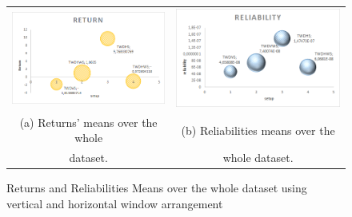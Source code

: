 \documentclass{beamer}
\begin{document}
\begin{frame}
\begin{figure}
    \centering
		\begin{tabular}{c c}
        \includegraphics[scale=0.5]{TWDReturns.png} &
        \includegraphics[scale=0.5]{TWDReliabilities.png} \\
      \scriptsize (a) Returns' means over the whole  & \scriptsize (b) Reliabilities means over the \\ 
			\scriptsize dataset. & \scriptsize whole dataset.\\
		\end{tabular}	
\caption{Returns and Reliabilities Means over the whole dataset using vertical and horizontal window arrangement}\label{fig:TrendTWD}
\end{figure}
\end{frame}
\end{document}
